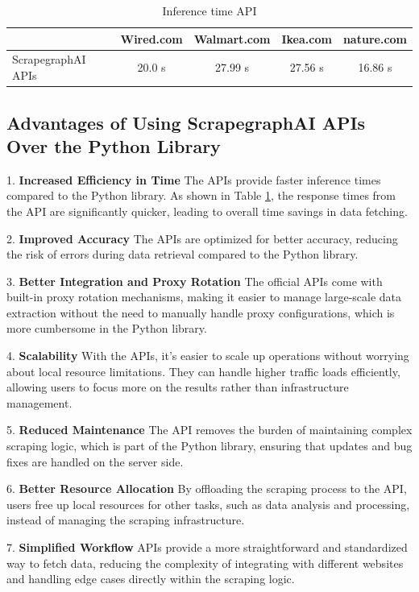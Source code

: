 \begin{table}[h!]
\centering
\begin{tabular}{|l|c|c|c|c|}
\hline
                & Wired.com & Walmart.com & Ikea.com & nature.com \\ \hline
ScrapegraphAI APIs   &    20.0 s      &  27.99 s    &  27.56 s & 16.86 s            \\ \hline
\end{tabular}
\caption{Inference time API}
\label{tab:comparison}
\end{table}

\newpage

\subsection{Advantages of Using ScrapegraphAI APIs Over the Python Library}

1. \textbf{Increased Efficiency in Time}  
   The APIs provide faster inference times compared to the Python library. As shown in Table \ref{tab:comparison}, the response times from the API are significantly quicker, leading to overall time savings in data fetching.

2. \textbf{Improved Accuracy}  
   The APIs are optimized for better accuracy, reducing the risk of errors during data retrieval compared to the Python library.

3. \textbf{Better Integration and Proxy Rotation}  
   The official APIs come with built-in proxy rotation mechanisms, making it easier to manage large-scale data extraction without the need to manually handle proxy configurations, which is more cumbersome in the Python library.

4. \textbf{Scalability}  
   With the APIs, it's easier to scale up operations without worrying about local resource limitations. They can handle higher traffic loads efficiently, allowing users to focus more on the results rather than infrastructure management.

5. \textbf{Reduced Maintenance}  
   The API removes the burden of maintaining complex scraping logic, which is part of the Python library, ensuring that updates and bug fixes are handled on the server side.

6. \textbf{Better Resource Allocation}  
   By offloading the scraping process to the API, users free up local resources for other tasks, such as data analysis and processing, instead of managing the scraping infrastructure.

7. \textbf{Simplified Workflow}  
   APIs provide a more straightforward and standardized way to fetch data, reducing the complexity of integrating with different websites and handling edge cases directly within the scraping logic.

